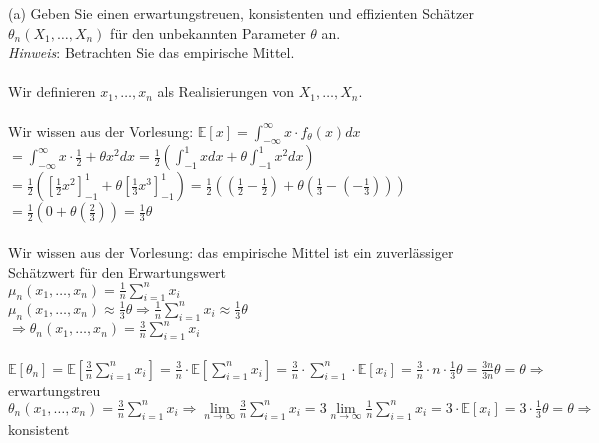 \documentclass[a4paper]{article}
\begin{document}
(a) Geben Sie einen erwartungstreuen, konsistenten und eﬃzienten Schätzer $\theta_n(X_1,\dots,X_n)$ für den unbekannten Parameter $\theta$ an.\\
\textit{Hinweis}: Betrachten Sie das empirische Mittel.\\\\
Wir definieren $x_1,\dots,x_n$ als Realisierungen von $X_1,\dots,X_n$.\\\\
Wir wissen aus der Vorlesung: \(\mathbb{E}[x]=\int^\infty_{-\infty}x \cdot f_\theta(x)dx\)\\
\hspace*{5.65cm}\(=\int^\infty_{-\infty}x \cdot \frac{1}{2}+\theta x^2 dx = \frac{1}{2}\left(\int^1_{-1}x dx + \theta \int^1_{-1}x^2 dx\right)\)\\
\hspace*{5.65cm}\(=\frac{1}{2}\left(\left[\frac{1}{2}x^2\right]^1_{-1}+\theta\left[\frac{1}{3}x^3\right]^1_{-1}\right)=\frac{1}{2}\left(\left(\frac{1}{2}-\frac{1}{2}\right)+\theta \left(\frac{1}{3}-\left(-\frac{1}{3}\right)\right)\right)\)\\
\hspace*{5.65cm}\(=\frac{1}{2}\left(0+\theta \left(\frac{2}{3}\right)\right)=\frac{1}{3}\theta\)\\\\
Wir wissen aus der Vorlesung: das empirische Mittel ist ein zuverlässiger Schätzwert für den Erwartungswert\\
$\mu_n(x_1,\dots,x_n)=\frac{1}{n}\sum\limits^n_{i=1}x_i$\\
\(\mu_n(x_1,\dots,x_n)\approx \frac{1}{3}\theta \Rightarrow \frac{1}{n}\sum\limits^n_{i=1}x_i \approx \frac{1}{3}\theta\)\\
\hspace*{3.17cm}\(\Rightarrow \theta_n(x_1,\dots,x_n)=\frac{3}{n}\sum\limits^n_{i=1}x_i\)\\\\
\(\mathbb{E}[\theta_n]= \mathbb{E}\left[\frac{3}{n}\sum\limits^n_{i=1}x_i\right]=\frac{3}{n}\cdot \mathbb{E}\left[\sum\limits^n_{i=1}x_i\right]=\frac{3}{n}\cdot \sum\limits^n_{i=1}\cdot \mathbb{E}[x_i]=\frac{3}{n}\cdot n \cdot \frac{1}{3}\theta=\frac{3n}{3n}\theta=\theta\Rightarrow\) erwartungstreu\\
\(\theta_n(x_1,\dots,x_n)=\frac{3}{n}\sum\limits^n_{i=1}x_i \Rightarrow \lim\limits_{n\to\infty}\frac{3}{n}\sum\limits^n_{i=1}x_i=3 \lim\limits_{n\to\infty}\frac{1}{n}\sum\limits^n_{i=1}x_i=3 \cdot \mathbb{E}[x_i]=3 \cdot \frac{1}{3}\theta = \theta \Rightarrow\) konsistent\\
\end{document}

